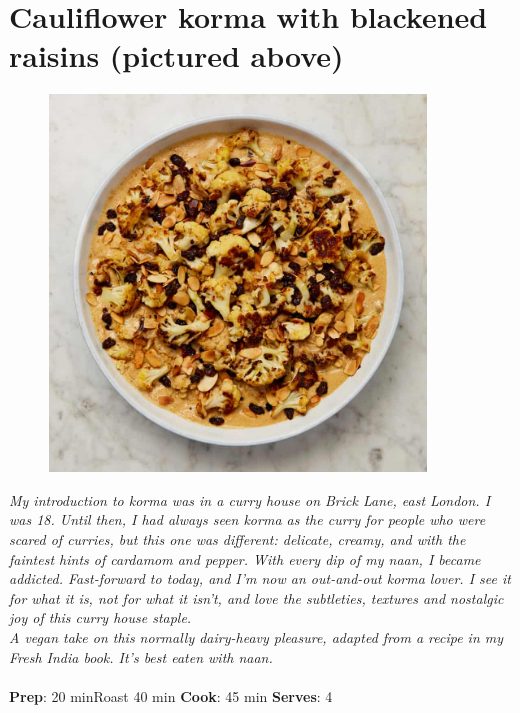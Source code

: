 \documentclass{book}
\begin{document}
\section{Cauliflower korma with blackened raisins (pictured above)}
\begin{figure}
\centering\includegraphics[width=10cm,height=10cm,keepaspectratio]{Recipe_Pictures/Cauliflower_korma_with_blackened_raisins_(pictured_above).png}
\end{figure}
\emph{My introduction to korma was in a curry house on Brick Lane, east London. I was 18. Until then, I had always seen korma as the curry for people who were scared of curries, but this one was different: delicate, creamy, and with the faintest hints of cardamom and pepper. With every dip of my naan, I became addicted. Fast-forward to today, and I’m now an out-and-out korma lover. I see it for what it is, not for what it isn’t, and love the subtleties, textures and nostalgic joy of this curry house staple.\\ 
A vegan take on this normally dairy-heavy pleasure, adapted from a recipe in my Fresh India book. It’s best eaten with naan.}\\\\ 
\textbf{Prep}: 20 minRoast 40 min
\textbf{Cook}: 45 min
\textbf{Serves}: 4
\end{document}
